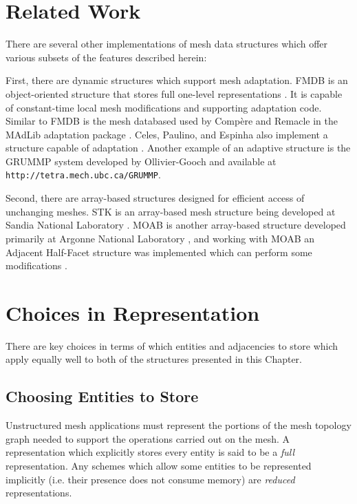 \section{Related Work}

There are several other implementations of mesh data structures
which offer various subsets of the features described herein:

First, there are dynamic structures which support mesh adaptation.
FMDB is an object-oriented structure that
stores full one-level representations \cite{seol2006efficient}.
It is capable of constant-time local
mesh modifications and supporting adaptation code.
Similar to FMDB is the mesh databased used by Comp\`{e}re and Remacle
in the MAdLib adaptation package \cite{compere2010mesh}.
Celes, Paulino, and Espinha also implement a structure capable of
adaptation \cite{celes2005compact}.
Another example of an adaptive structure
is the GRUMMP system developed by Ollivier-Gooch
and available at \texttt{http://tetra.mech.ubc.ca/GRUMMP}.

Second, there are array-based structures designed for
efficient access of unchanging meshes.
STK is an array-based mesh structure being developed at
Sandia National Laboratory \cite{edwards2010sierra}.
MOAB is another array-based structure developed primarily
at Argonne National Laboratory \cite{tautges_moab:_2004},
and working with MOAB an Adjacent Half-Facet structure
was implemented which can perform some modifications \cite{dyedov2014ahf}.

\section{Choices in Representation}

There are key choices in terms of which entities
and adjacencies to store which apply equally well
to both of the structures presented in this Chapter.

\subsection{Choosing Entities to Store}

Unstructured mesh applications must represent
the portions of the mesh topology graph
needed to support the operations carried out on the mesh.
A representation which explicitly stores
every entity is said to be a {\it full}
representation.
Any schemes which allow some entities to be represented
implicitly (i.e. their presence does not consume memory)
are {\it reduced} representations.

